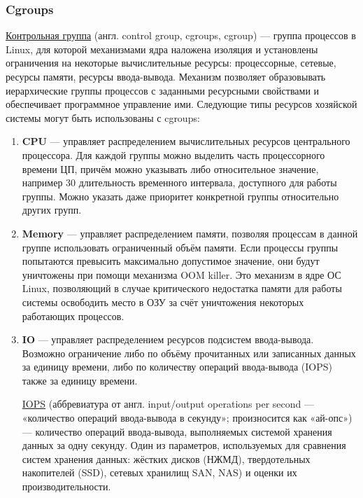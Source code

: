 \documentclass[14pt, a4paper]{article}
\begin{document}
\subsubsection*{Cgroups}

\href{https://ru.wikipedia.org/wiki/Êîíòðîëüíàÿ_ãðóïïà_(Linux)}{Контрольная группа} (англ. control group, cgroups, cgroup) — группа процессов в Linux, для которой
механизмами ядра наложена изоляция и установлены ограничения на некоторые вычислительные
ресурсы: процессорные, сетевые, ресурсы памяти, ресурсы ввода-вывода. Механизм позволяет
образовывать иерархические группы процессов с заданными ресурсными свойствами и обеспечивает
программное управление ими. Следующие типы ресурсов хозяйской системы могут быть
использованы с cgroups:

\begin{enumerate}
    \item \textbf{CPU} — управляет распределением вычислительных ресурсов центрального процессора. Для
    каждой группы можно выделить часть процессорного времени ЦП, причём можно указывать
    либо относительное значение, например 30%
    длительность временного интервала, доступного для работы группы. Можно указать даже
    приоритет конкретной группы относительно других групп.
    \item \textbf{Memory} — управляет распределением памяти, позволяя процессам в данной группе
    использовать ограниченный объём памяти. Если процессы группы попытаются превысить
    максимально допустимое значение, они будут уничтожены при помощи механизма OOM killer.
    Это механизм в ядре ОС Linux, позволяющий в случае критического недостатка памяти для
    работы системы освободить место в ОЗУ за счёт уничтожения некоторых работающих
    процессов.
    \item \textbf{IO} — управляет распределением ресурсов подсистем ввода-вывода. Возможно ограничение
    либо по объёму прочитанных или записанных данных за единицу времени, либо по количеству
    операций ввода-вывода (IOPS) также за единицу времени.

    \href{https://ru.wikipedia.org/wiki/IOPS}{IOPS} (аббревиатура от англ. input/output operations per second — «количество операций ввода-вывода
в секунду»; произносится как «ай-опс») — количество операций ввода-вывода, выполняемых
системой хранения данных за одну секунду. Один из параметров, используемых для сравнения
систем хранения данных: жёстких дисков (НЖМД), твердотельных накопителей (SSD), сетевых
хранилищ SAN, NAS) и оценки их производительности.


\end{enumerate}
\end{document}
